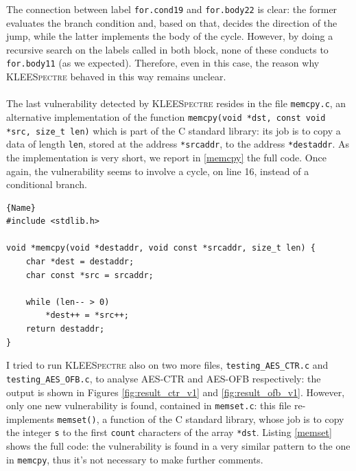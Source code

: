 \documentclass[12pt,a4paper]{book}
\theoremstyle{definition}
\begin{document}
	The connection between label \texttt{for.cond19} and \texttt{for.body22} is clear: the former evaluates the branch condition and, based on that, decides the direction of the jump, while the latter implements the body of the cycle. However, by doing a recursive search on the labels called in both block, none of these conducts to \texttt{for.body11} (as we expected). Therefore, even in this case, the reason why \textsc{KLEESpectre} behaved in this way remains unclear.
	\paragraph{}The last vulnerability detected by \textsc{KLEESpectre} resides in the file \texttt{memcpy.c}, an alternative implementation of the function \texttt{memcpy(void *dst, const void *src, size\_t len)} which is part of the C standard library: its job is to copy a data of length \texttt{len}, stored at the address \texttt{*srcaddr}, to the address \texttt{*destaddr}. As the implementation is very short, we report in \ref{memcpy} the full code. Once again, the vulnerability seems to involve a cycle, on line 16, instead of a conditional branch.
	
	\lstset{
		numbers=left
	}
	\begin{minipage}{.9\textwidth}
	\begin{lstlisting}[caption=\texttt{memcpy.c}, firstnumber=10, label=memcpy]{Name}
#include <stdlib.h>

void *memcpy(void *destaddr, void const *srcaddr, size_t len) {
	char *dest = destaddr;
	char const *src = srcaddr;
	
	while (len-- > 0)
		*dest++ = *src++;
	return destaddr;
}
	\end{lstlisting}
	\end{minipage}	
	\vspace{3mm}
		
	I tried to run \textsc{KLEESpectre} also on two more files, \texttt{testing\_AES\_CTR.c} and \texttt{testing\_AES\_OFB.c}, to analyse AES-CTR and AES-OFB respectively: the output is shown in Figures \ref{fig:result_ctr_v1} and \ref{fig:result_ofb_v1}. However, only one new vulnerability is found, contained in \texttt{memset.c}: this file re-implements \texttt{memset()}, a function of the C standard library, whose job is to copy the integer \texttt{s} to the first \texttt{count} characters of the array \texttt{*dst}. Listing \ref{memset} shows the full code: the vulnerability is found in a very similar pattern to the one in \texttt{memcpy}, thus it's not necessary to make further comments.
\end{document}
